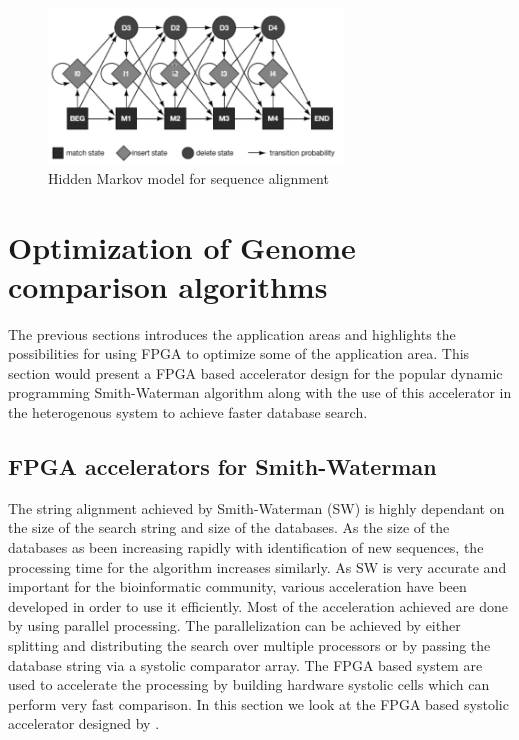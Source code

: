 \documentclass[12pt,twoside]{article}
\begin{document}
\begin{figure}%
    \centering
    \includegraphics[width=0.7\textwidth]{fig/hmm}
    \caption{Hidden Markov model for sequence alignment \cite[Figure 4.16]{mount_bioinformatics:_2004}}
    \label{fig:hmm}
\end{figure}

\section{Optimization of Genome comparison algorithms}
\label{sec:designtech}

The previous sections introduces the application areas and highlights the possibilities for using FPGA to optimize some of the application
area. This section would present a FPGA based accelerator design for the popular dynamic programming Smith-Waterman algorithm along
with the use of this accelerator in the heterogenous system to achieve faster database search.

\subsection{FPGA accelerators for Smith-Waterman}
\label{fpgaaccelerator}

The string alignment achieved by Smith-Waterman (SW) is highly dependant on the size of the search string and size of the databases.
As the size of the databases as been increasing rapidly with identification of new sequences, the processing time for the algorithm
increases similarly. As SW is very accurate and important for the bioinformatic community, various acceleration have been developed
in order to use it efficiently. Most of the acceleration achieved are done by using parallel processing. The parallelization can be achieved
by either splitting and distributing the search over multiple processors \cite{martins_multithreaded_2000, boukerche_parallel_2005, schmidt_massively_2002, rucci_smith-waterman_2014}
or by passing the database string via a systolic comparator array. The FPGA based system are used to accelerate the processing by 
building hardware systolic cells which can perform very fast comparison. In this section we look at the FPGA based systolic accelerator
designed by \textcite{oliver_hyper_2005}.
\end{document}
